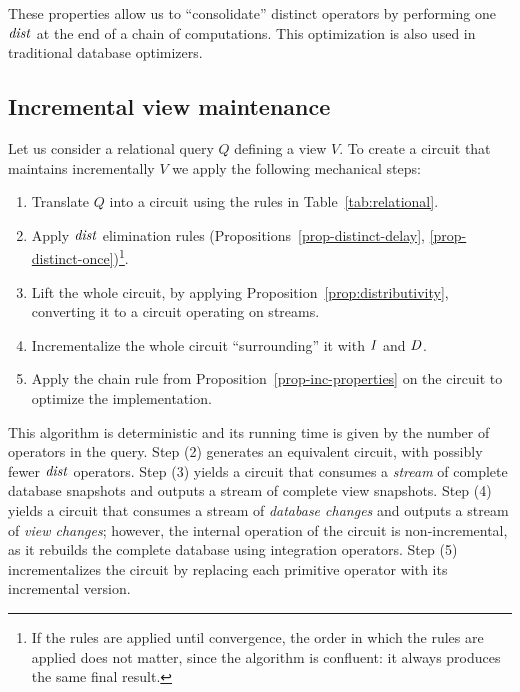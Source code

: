 These properties allow us to ``consolidate'' distinct operators by
performing one $\mathit{dist}$ at the end of a chain of computations.
This optimization is also used in traditional database optimizers.

\subsection{Incremental view maintenance}

Let us consider a relational query $Q$ defining a view $V$.  To create
a circuit that maintains incrementally $V$ we apply the following
mechanical steps:

\begin{algorithm}%
  \label{algorithm-inc}\quad
\begin{enumerate}[nosep, leftmargin=\parindent]
    \item Translate $Q$ into a circuit using the rules in Table~\ref{tab:relational}.
    \item Apply $\mathit{dist}$ elimination rules
      (Propositions~\ref{prop-distinct-delay},
      \ref{prop-distinct-once})\footnote{If the rules are applied
      until convergence, the order in which the rules
      are applied does not matter, since the algorithm is confluent:
      it always produces the same final result.}.
    \item Lift the whole circuit, by applying Proposition~\ref{prop:distributivity},
    converting it to a circuit operating on streams.
    \item Incrementalize the whole circuit ``surrounding'' it with $\mathit{I}$ and $\mathit{D}$.
    \item Apply the chain rule from
      Proposition~\ref{prop-inc-properties} on the circuit to optimize
      the implementation.
\end{enumerate}
\end{algorithm}

This algorithm is deterministic and its running time
is given by the number of operators in the query.
Step (2) generates an equivalent circuit, with possibly fewer
$\mathit{dist}$ operators.  Step (3) yields a circuit that consumes a
\emph{stream} of complete database snapshots and outputs a stream of
complete view snapshots. Step (4) yields a circuit that consumes a
stream of \emph{database changes} and outputs a stream of \emph{view
changes}; however, the internal operation of the circuit is
non-incremental, as it rebuilds the complete database using
integration operators.  Step (5) incrementalizes the circuit by
replacing each primitive operator with its incremental version.

